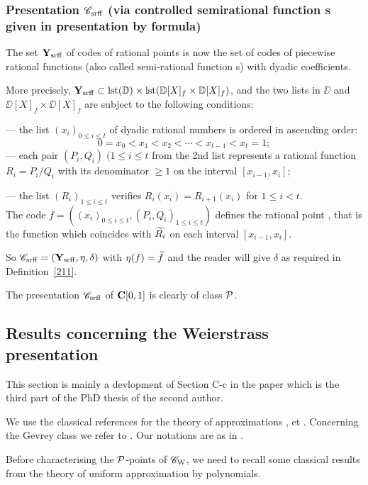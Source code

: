 \subsubsection{Presentation ${{{\mathscr C}}_{\rm srff}}$ (via controlled semirational function s given in presentation by formula)}\label{subsubsec513}

The set ${{\bf Y}_{\rm srff}}$ of codes of rational points is now the set of codes of piecewise rational functions (also called semi-rational function s) with dyadic coefficients. 

More precisely, ${{\bf Y}_{\rm srff}} \subset {\rm lst}(\mathbb {D}) \times {\rm lst}(\mathbb {D}[X]_f \times \mathbb {D}[X]_f)$, and the two lists in $\DD$ and $\DD[X]_f \times \DD[X]_f$ are subject to the following conditions:

\noindent 
--- the list $(x_i)_{0 \leq i \leq t}$ of dyadic rational numbers is ordered in ascending order: 
\[
0 = x_0 < x_1 < x_2 <\cdots< x_{t-1} < x_t =1;
\]
--- each pair $(P_i,Q_i) \; (1 \leq i \leq t$ from the 2nd list represents a rational function $R_i = P_i/Q_i$ with its denominator $\geq  1$ on the interval $[x_{i-1} , x_i]$;

\noindent 
--- the list $(R_i)_{1 \leq i \leq t}$ verifies $R_i(x_i) = R_{i+1}(x_i)$
 for $1 \leq i < t$.
\\
The code  $f = ((x_i)_{0 \leq i \leq t},(P_i,Q_i)_{1 \leq i \leq t})$ defines the rational point  , that is the function which coincides with $\widetilde{R_i}$ on each interval $[x_{i-1} , x_i]$.

\smallskip So ${{{\mathscr C}}_{\rm srff}}=({{\bf Y}_{\rm srff}},\eta,\delta)$ with $\eta(f)=\widetilde f$ and the reader will give $\delta$ as required in Definition~\ref{211}.

\smallskip The presentation ${{{\mathscr C}}_{\rm srff}}$ of ${{\bf C}[0,1]}$ is clearly of class ${\cal P}$.

\subsection {Results concerning the Weierstrass presentation}\label{subsec52}

This section is mainly a  devlopment of Section C-c in the paper \cite{Lo89} which is the third part of the PhD thesis of the second author.

We use the classical references for the theory of approximations 
\cite[Bakhvalov, 1973]{Ba},
\cite[Cheney, 1966]{Ch} et \cite[Rivlin, 1974]{Ri}. Concerning the Gevrey class we refer to \cite[Hörmander, 1983]{Ho}. Our notations are as in \cite{Ch}.   

\smallskip  
Before characterising the ${\cal P}$-points of ${{{\mathscr C}}_{\rm W}}$, we need to recall some classical results from the theory of uniform approximation by polynomials.

